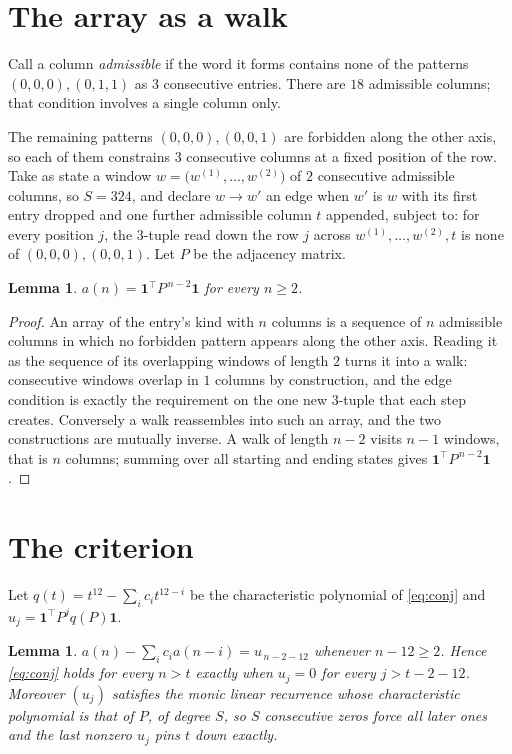 \documentclass[11pt,a4paper]{article}
\theoremstyle{plain}
\newtheorem{lemma}[theorem]{Lemma}
\theoremstyle{definition}
\begin{document}
\section{The array as a walk}

Call a column \emph{admissible} if the word it forms contains none of the patterns
$(0,0,0), (0,1,1)$ as $3$ consecutive entries. There are $18$ admissible columns; that condition
involves a single column only.

The remaining patterns $(0,0,0), (0,0,1)$ are forbidden along the other axis, so each of them
constrains $3$ consecutive columns at a fixed position of the row. Take as state a
window $w=\bigl(w^{(1)},\dots,w^{(2)}\bigr)$ of $2$ consecutive admissible
columns, so $S=324$, and declare $w\to w'$ an edge when $w'$ is $w$ with its first entry
dropped and one further admissible column $t$ appended, subject to: for every position
$j$, the $3$-tuple read down the row $j$ across $w^{(1)},\dots,w^{(2)},t$
is none of $(0,0,0), (0,0,1)$. Let $P$ be the adjacency matrix.

\begin{lemma}\label{lem:walk}
$a(n)=\mathbf{1}^{\!\top}P^{\,n-2}\mathbf{1}$ for every $n\ge2$.
\end{lemma}

\begin{proof}
An array of the entry's kind with $n$ columns is a sequence of $n$ admissible columns in
which no forbidden pattern appears along the other axis. Reading it as the sequence of its
overlapping windows of length $2$ turns it into a walk: consecutive windows overlap in
$1$ columns by construction, and the edge condition is exactly the requirement on the one
new $3$-tuple that each step creates. Conversely a walk reassembles into such an array,
and the two constructions are mutually inverse. A walk of length $n-2$ visits $n-1$
windows, that is $n$ columns; summing over all starting and ending states gives
$\mathbf{1}^{\!\top}P^{\,n-2}\mathbf{1}$.
\end{proof}

\section{The criterion}

Let $q(t)=t^{12}-\sum_i c_i t^{12-i}$ be the characteristic polynomial of
\eqref{eq:conj} and $u_j=\mathbf{1}^{\!\top}P^{j}q(P)\mathbf{1}$.

\begin{lemma}\label{lem:crit}
$a(n)-\sum_i c_i a(n-i)=u_{\,n-2-12}$ whenever $n-12\ge2$. Hence
\eqref{eq:conj} holds for every $n>t$ exactly when $u_j=0$ for every
$j>t-2-12$. Moreover $(u_j)$ satisfies the monic linear recurrence whose
characteristic polynomial is that of $P$, of degree $S$, so $S$ consecutive zeros force all
later ones and the last nonzero $u_j$ pins $t$ down exactly.
\end{lemma}
\end{document}
